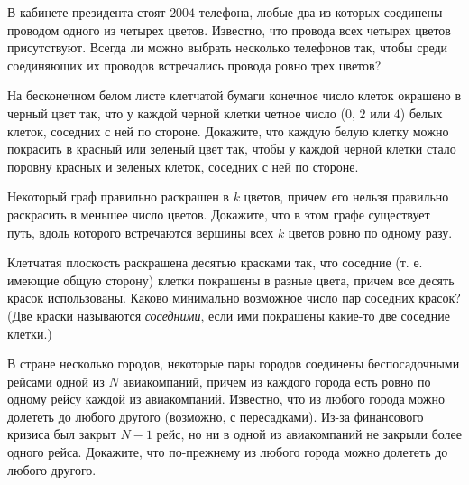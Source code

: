 \begin{exersize}
	В кабинете президента стоят $2004$ телефона, любые два из которых соединены проводом одного из четырех цветов. Известно, что провода всех четырех цветов присутствуют. Всегда ли можно выбрать несколько телефонов так, чтобы среди соединяющих их проводов встречались провода ровно трех цветов?
\end{exersize}	 

\begin{exersize}
	На бесконечном белом листе клетчатой бумаги конечное число клеток окрашено в черный цвет так, что у каждой черной клетки четное число ($0$, $2$ или $4$) белых клеток, соседних с ней по стороне. Докажите, что каждую белую клетку можно покрасить в красный или зеленый цвет так, чтобы у каждой черной клетки стало поровну красных и зеленых клеток, соседних с ней по стороне.
\end{exersize}	 	 

\begin{exersize}
	Некоторый граф правильно раскрашен в $k$ цветов, причем его нельзя правильно раскрасить в меньшее число цветов. Докажите, что в этом графе существует путь, вдоль которого встречаются вершины всех $k$ цветов ровно по одному разу.
\end{exersize}	

\begin{exersize}
	Клетчатая плоскость раскрашена десятью красками так, что соседние (т. е. имеющие общую сторону) клетки покрашены в разные цвета, 
	причем все десять красок использованы. Каково минимально возможное число пар соседних красок? 
	(Две краски называются \emph{соседними}, если ими покрашены какие-то две соседние клетки.)
\end{exersize}

\begin{exersize}
	В стране несколько городов, некоторые пары городов соединены беспосадочными рейсами одной из $N$ авиакомпаний, причем из каждого города есть ровно по одному рейсу каждой из авиакомпаний. Известно, что из любого города можно долететь до любого другого (возможно, с пересадками). Из-за финансового кризиса был закрыт $N-1$ рейс, но ни в одной из авиакомпаний не закрыли более одного рейса. Докажите, что по-прежнему из любого города можно долететь до любого другого.
\end{exersize}	 

